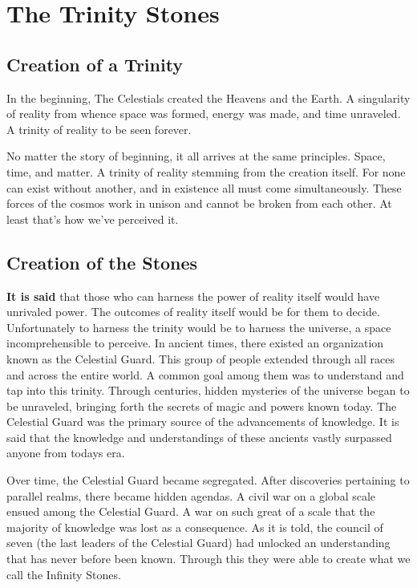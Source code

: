 \chapter{The Trinity Stones}

\section{Creation of a Trinity}

\begin{quotebox}
	In the beginning, The Celestials created the Heavens and the Earth. A singularity of reality from whence space was formed, energy was made, and time unraveled. A trinity of reality to be seen forever.
\end{quotebox}

No matter the story of beginning, it all arrives at the same principles. Space, time, and matter. A trinity of reality stemming from the creation itself. For none can exist without another, and in existence all must come simultaneously. These forces of the cosmos work in unison and cannot be broken from each other. At least that's how we've perceived it.

\section{Creation of the Stones}

\textbf{It is said} that those who can harness the power of reality itself would have unrivaled power. The outcomes of reality itself would be for them to decide. Unfortunately to harness the trinity would be to harness the universe, a space incomprehensible to perceive. In ancient times, there existed an organization known as the Celestial Guard. This group of people extended through all races and across the entire world. A common goal among them was to understand and tap into this trinity. Through centuries, hidden mysteries of the universe began to be unraveled, bringing forth the secrets of magic and powers known today. The Celestial Guard was the primary source of the advancements of knowledge. It is said that the knowledge and understandings of these ancients vastly surpassed anyone from todays era. 

Over time, the Celestial Guard became segregated. After discoveries pertaining to parallel realms, there became hidden agendas. A civil war on a global scale ensued among the Celestial Guard. A war on such great of a scale that the majority of knowledge was lost as a consequence. As it is told, the council of seven (the last leaders of the Celestial Guard) had unlocked an understanding that has never before been known. Through this they were able to create what we call the Infinity Stones. 

